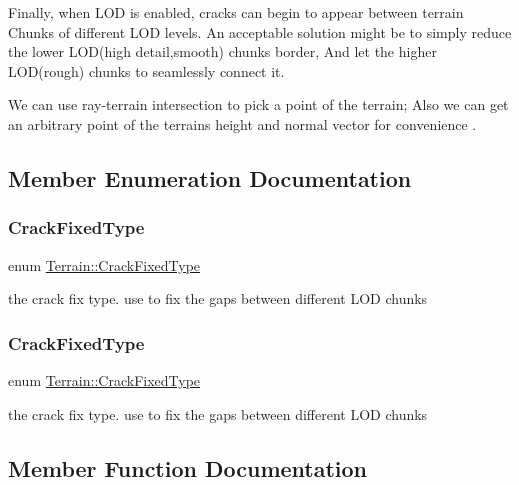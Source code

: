 Finally, when L\+OD is enabled, cracks can begin to appear between terrain Chunks of different L\+OD levels. An acceptable solution might be to simply reduce the lower L\+O\+D(high detail,smooth) chunks border, And let the higher L\+O\+D(rough) chunks to seamlessly connect it.

We can use ray-\/terrain intersection to pick a point of the terrain; Also we can get an arbitrary point of the terrain\textquotesingle{}s height and normal vector for convenience . 

\subsection{Member Enumeration Documentation}
\mbox{\label{classTerrain_af3dc2d6c44474fdbd9552d69e553ef93}} 
\subsubsection{\texorpdfstring{Crack\+Fixed\+Type}{CrackFixedType}\hspace{0.1cm}{\footnotesize\ttfamily [1/2]}}
{\footnotesize\ttfamily enum \hyperlink{classTerrain_af3dc2d6c44474fdbd9552d69e553ef93}{Terrain\+::\+Crack\+Fixed\+Type}\hspace{0.3cm}{\ttfamily [strong]}}

the crack fix type. use to fix the gaps between different L\+OD chunks \mbox{\label{classTerrain_af3dc2d6c44474fdbd9552d69e553ef93}} 
\subsubsection{\texorpdfstring{Crack\+Fixed\+Type}{CrackFixedType}\hspace{0.1cm}{\footnotesize\ttfamily [2/2]}}
{\footnotesize\ttfamily enum \hyperlink{classTerrain_af3dc2d6c44474fdbd9552d69e553ef93}{Terrain\+::\+Crack\+Fixed\+Type}\hspace{0.3cm}{\ttfamily [strong]}}

the crack fix type. use to fix the gaps between different L\+OD chunks 

\subsection{Member Function Documentation}
\mbox{\label{classTerrain_a33ce1e6fa0fff42e42f510d29553e015}} 
